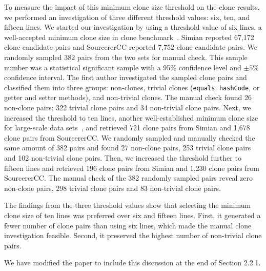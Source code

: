 \documentclass[a4paper,twoside,10pt]{reviewresponse}
\begin{document}
To measure the impact of this minimum clone size threshold on the clone results,
we performed an investigation of three different threshold values: six, ten, and
fifteen lines. We started our investigation by using a threshold value of six
lines, a well-accepted minimum clone size in clone benchmark~\citep{Bellon2007}.
Simian reported 67,172 clone candidate pairs and SourcererCC reported 7,752
clone candidate pairs. We randomly sampled 382 pairs from the two sets for
manual check. This sample number was a statistical significant sample with a
95\% confidence level and $\pm 5\%$ confidence interval. The first author
investigated the sampled clone pairs and classified them into three groups:
non-clones, trivial clones (\texttt{equals}, \texttt{hashCode}, or getter and
setter methods), and non-trivial clones. The manual check found 26 non-clone
pairs; 322 trivial clone pairs and 34 non-trivial clone pairs. Next, we
increased the threshold to ten lines, another well-established minimum clone
size for large-scale data sets~\cite{Sajnani2016}, and retrieved 721 clone pairs
from Simian and 1,678 clone pairs from SourcererCC. We randomly sampled and
manually checked the same amount of 382 pairs and found 27 non-clone pairs, 253
trivial clone pairs and 102 non-trivial clone pairs. Then, we increased the
threshold further to fifteen lines and retrieved 196 clone pairs from Simian and
1,230 clone pairs from SourcererCC. The manual check of the 382 randomly sampled
pairs reveal zero non-clone pairs, 298 trivial clone pairs and 83 non-trivial
clone pairs.

The findings from the three threshold values show that selecting the minimum
clone size of ten lines was preferred over six and fifteen lines. First, it
generated a fewer number of clone pairs than using six lines, which made the
manual clone investigation feasible. Second, it preserved the highest number of
non-trivial clone pairs.

We have modified the paper to include this discussion at the end of Section
2.2.1.

\end{document}
